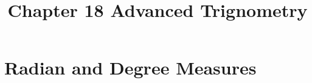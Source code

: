 \documentclass{article}
\title{Chapter 18
Advanced Trignometry}
\author{}
\date{}
\begin{document}
\maketitle
\section{Radian and Degree Measures}
\end{document}
